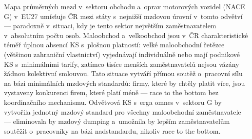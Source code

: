Mapa průměrných mezd v~sektoru obchodu a~oprav motorových vozidel (\ac{NACE} G) v~EU27 umísťuje ČR mezi státy s~nejnižší mzdovou úrovní v~tomto odvětví --- paradoxně v~situaci, kdy je tento sektor největším zaměstnavatelem v~absolutním počtu osob.
Maloobchod a~velkoobchod jsou v~ČR charakteristické téměř úplnou absencí \ac{KS} s~plošnou platností: velké maloobchodní řetězce (většinou zahraniční vlastnictví) vyjednávají individuálně nebo mají podnikové \ac{KS} s~minimálními tarify, zatímco tisíce menších zaměstnavatelů nejsou vázány žádnou kolektivní smlouvou.
Tato situace vytváří přímou soutěž o~pracovní sílu na bázi minimálních mzdových standardů: firmy, které by chtěly platit více, jsou vystaveny konkurenci firem, které platí méně --- race to the bottom bez koordinačního mechanismu.
Odvětvová \ac{KS} s~erga omnes v~sektoru G by vytvořila jednotný mzdový standard pro všechny maloobchodní zaměstnavatele --- eliminovala by mzdový dumping a~umožnila by lepším zaměstnavatelům soutěžit o~pracovníky na bázi nadstandardu, nikoliv race to the bottom.


